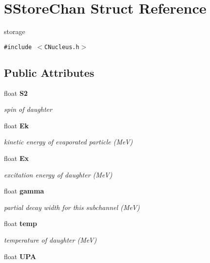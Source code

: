\section{SStore\-Chan Struct Reference}
\label{structSStoreChan}
storage  


{\tt \#include $<$CNucleus.h$>$}

\subsection*{Public Attributes}
\begin{CompactItemize}
\item 
float \bf{S2}\label{structSStoreChan_927c843df2c51901654a9bd43a1c145d}

\begin{CompactList}\small\item\em spin of daughter \item\end{CompactList}\item 
float \bf{Ek}\label{structSStoreChan_557aa9e17b40b647cb01c1021f877c8a}

\begin{CompactList}\small\item\em kinetic energy of evaporated particle (Me\-V) \item\end{CompactList}\item 
float \bf{Ex}\label{structSStoreChan_266e493af0e2955bda2b7d22621c06b3}

\begin{CompactList}\small\item\em excitation energy of daughter (Me\-V) \item\end{CompactList}\item 
float \bf{gamma}\label{structSStoreChan_a4dc43162feda8351b8e2eef730cf03e}

\begin{CompactList}\small\item\em partial decay width for this subchannel (Me\-V) \item\end{CompactList}\item 
float \bf{temp}\label{structSStoreChan_dab32fa25d467a4e04f17f8b6fd0fb02}

\begin{CompactList}\small\item\em temperature of daughter (Me\-V) \item\end{CompactList}\item 
float \bf{UPA}\label{structSStoreChan_a854f105685f825038d7970e7282b4ae}


\end{CompactItemize}
